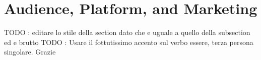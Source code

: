 \section{Audience, Platform, and Marketing}

TODO : editare lo stile della section dato che e uguale a quello della subsection ed e brutto
TODO : Usare il fottutissimo accento sul verbo essere, terza persona singolare. Grazie







\pagebreak 